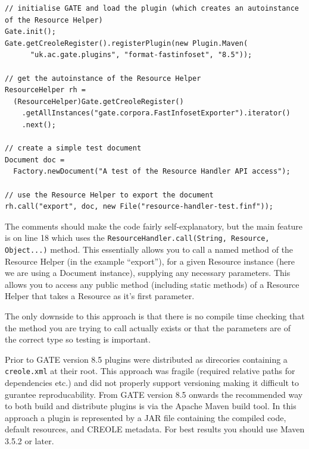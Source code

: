 \begin{lstlisting}
// initialise GATE and load the plugin (which creates an autoinstance of the Resource Helper)
Gate.init();
Gate.getCreoleRegister().registerPlugin(new Plugin.Maven(
      "uk.ac.gate.plugins", "format-fastinfoset", "8.5"));

// get the autoinstance of the Resource Helper
ResourceHelper rh =
  (ResourceHelper)Gate.getCreoleRegister()
    .getAllInstances("gate.corpora.FastInfosetExporter").iterator()
    .next();

// create a simple test document
Document doc =
  Factory.newDocument("A test of the Resource Handler API access");

// use the Resource Helper to export the document
rh.call("export", doc, new File("resource-handler-test.finf"));
\end{lstlisting}

The comments should make the code fairly self-explanatory, but the main feature
is on line 18 which uses the \lstinline!ResourceHandler.call(String, Resource, Object...)!
method. This essentially allows you to call a named method of the Resource Helper
(in the example ``export''), for a given Resource instance (here we are using a
Document instance), supplying any necessary parameters. This allows you to
access any public method (including static methods) of a Resource Helper that
takes a Resource as it's first parameter.

The only downside to this approach is that there is no compile time checking
that the method you are trying to call actually exists or that the parameters
are of the correct type so testing is important.


Prior to GATE version 8.5 plugins were distributed as direcories containing
a \verb!creole.xml! at their root. This approach was fragile (required relative
paths for dependencies etc.) and did not properly support versioning making it
difficult to gurantee reproducability. From GATE version 8.5 onwards the recommended
way to both build and distribute plugins is via the Apache Maven build tool.
In this approach a plugin is represented by a JAR file containing the compiled code,
default resources, and CREOLE metadata.  For best results you should use
Maven 3.5.2 or later.

